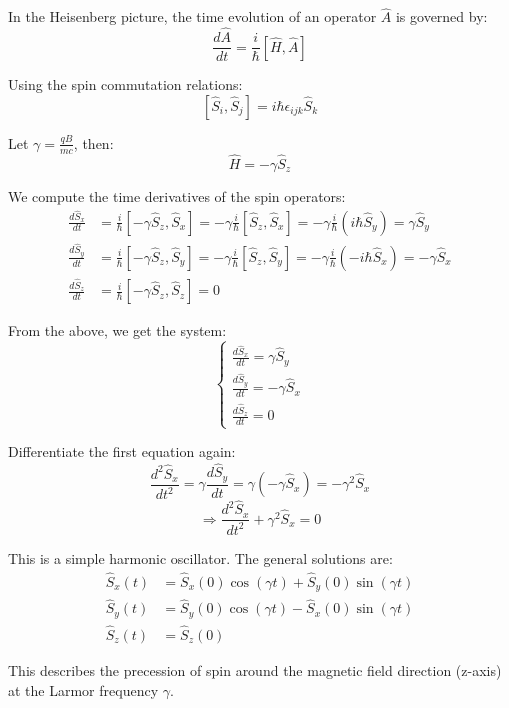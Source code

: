 \documentclass[12pt]{article}
\begin{document}
In the Heisenberg picture, the time evolution of an operator \( \hat{A} \) is governed by:
\[
\frac{d\hat{A}}{dt} = \frac{i}{\hbar} [\hat{H}, \hat{A}]
\]

Using the spin commutation relations:
\[
[\hat{S}_i, \hat{S}_j] = i\hbar \epsilon_{ijk} \hat{S}_k
\]

Let \( \gamma = \frac{qB}{mc} \), then:
\[
\hat{H} = -\gamma \hat{S}_z
\]

We compute the time derivatives of the spin operators:
\begin{align*}
\frac{d\hat{S}_x}{dt} &= \frac{i}{\hbar} [-\gamma \hat{S}_z, \hat{S}_x] 
= -\gamma \frac{i}{\hbar} [\hat{S}_z, \hat{S}_x] 
= -\gamma \frac{i}{\hbar} (i\hbar \hat{S}_y) 
= \gamma \hat{S}_y \\
\frac{d\hat{S}_y}{dt} &= \frac{i}{\hbar} [-\gamma \hat{S}_z, \hat{S}_y] 
= -\gamma \frac{i}{\hbar} [\hat{S}_z, \hat{S}_y] 
= -\gamma \frac{i}{\hbar} (-i\hbar \hat{S}_x) 
= -\gamma \hat{S}_x \\
\frac{d\hat{S}_z}{dt} &= \frac{i}{\hbar} [-\gamma \hat{S}_z, \hat{S}_z] = 0
\end{align*}

From the above, we get the system:
\[
\begin{cases}
\frac{d\hat{S}_x}{dt} = \gamma \hat{S}_y \\
\frac{d\hat{S}_y}{dt} = -\gamma \hat{S}_x \\
\frac{d\hat{S}_z}{dt} = 0
\end{cases}
\]

Differentiate the first equation again:
\[
\frac{d^2\hat{S}_x}{dt^2} = \gamma \frac{d\hat{S}_y}{dt} = \gamma (-\gamma \hat{S}_x) = -\gamma^2 \hat{S}_x
\]
\[
\Rightarrow \frac{d^2\hat{S}_x}{dt^2} + \gamma^2 \hat{S}_x = 0
\]

This is a simple harmonic oscillator. The general solutions are:
\begin{align*}
\hat{S}_x(t) &= \hat{S}_x(0) \cos(\gamma t) + \hat{S}_y(0) \sin(\gamma t) \\
\hat{S}_y(t) &= \hat{S}_y(0) \cos(\gamma t) - \hat{S}_x(0) \sin(\gamma t) \\
\hat{S}_z(t) &= \hat{S}_z(0)
\end{align*}

This describes the precession of spin around the magnetic field direction (z-axis) at the Larmor frequency \( \gamma \).
\end{document}
